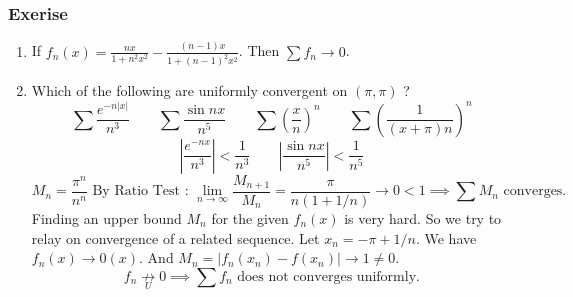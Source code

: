 \subsubsection*{Exerise}
\begin{enumerate}
	\item If $f_n(x) = \frac{nx}{1+n^2x^2} - \frac{(n-1)x}{1+(n-1)^2x^2}$.
	Then $\sum f_n \to 0$.
	\item Which of the following are uniformly convergent on $(\pi,\pi)$ ?\\ %
	$$\sum \frac{e^{-n|x|}}{n^3} \qquad \sum \frac{\sin nx}{n^5} \qquad \sum \left(\frac{x}{n}\right)^n \qquad \sum \left(\frac{1}{(x+\pi)n}\right)^n$$
	$$\left|\frac{e^{-nx}}{n^3}\right| < \frac{1}{n^3} \qquad \left|\frac{\sin nx}{n^5}\right| < \frac{1}{n^5}$$
		$$M_n = \frac{\pi^n}{n^n} \text{ By Ratio Test : } \lim_{n \to \infty} \frac{M_{n+1}}{M_n} = \frac{\pi}{n(1+1/n)} \to 0 < 1 \implies \sum M_n \text{ converges.}$$
	Finding an upper bound $M_n$ for the given $f_n(x)$ is very hard. So we try to relay on convergence of a related sequence.
		Let $x_n = -\pi + 1/n$. We have $f_n(x) \to 0(x)$. And $M_n = |f_n(x_n) - f(x_n)| \to 1 \ne 0$.
	$$f_n \underset{U}{\not\to} 0 \implies \sum f_n  \text{ does not converges uniformly.}$$
\end{enumerate}

